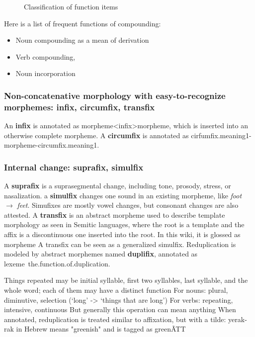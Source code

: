 \documentclass[UTF8, a4paper, oneside, scheme=plain]{ctexart}
\newcommand*{\concept}[1]{\textbf{#1}}
\newcommand*{\corpus}[1]{\emph{#1}}
\newcommand*{\translate}[1]{`#1'}
\begin{document}
\begin{figure}
    \centering
    
    \caption{Classification of function items}
\end{figure}

Here is a list of frequent functions of compounding:
\begin{itemize}
    \item Noun compounding as a mean of derivation
    \item Verb compounding, 
    \item Noun incorporation
\end{itemize} 

\subsubsection{Non-concatenative morphology with easy-to-recognize morphemes: infix, circumfix, transfix}

An \concept{infix} is annotated as morpheme<infix>morpheme,
which is inserted into an otherwise complete morpheme.
A \concept{circumfix} is annotated as cirfumfix.meaning1-morpheme-circumfix.meaning1.


\subsubsection{Internal change: suprafix, simulfix}

A \concept{suprafix} is a suprasegmental change, including tone, prosody, stress, or nasalization.
a \concept{simulfix} changes one sound in an existing morpheme,
like \corpus{foot} $\to$ \corpus{feet}.
Simufixes are mostly vowel changes,
but consonant changes are also attested.
A \concept{transfix} is an abstract morpheme used to describe 
template morphology as seen in Semitic languages, 
where the root is a template and the affix is a discontinuous one inserted into the root. 
In this wiki, it is glossed as morpheme 
A transfix can be seen as a generalized simulfix.
Reduplication is modeled by abstract morphemes named \concept{duplifix},
annotated as lexeme~the.function.of.duplication.

Things repeated may be initial syllable, first two syllables, last syllable, and the whole word; each of them may have a distinct function
For nouns: plural, diminutive, selection (\translate{long} -> \translate{things that are long})
For verbs: repeating, intensive, continuous
But generally this operation can mean anything
When annotated, reduplication is treated similar to affixation, but with a tilde: yerak-rak in Hebrew means "greenish" and is tagged as green\~ATT
\end{document}
